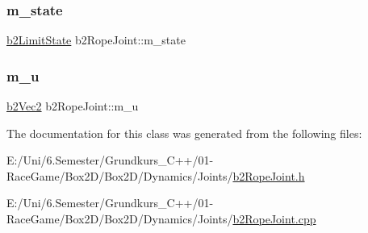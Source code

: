\mbox{\label{classb2_rope_joint_ac73c9451360c80c8a98376b922f4bed4}} 
\subsubsection{\texorpdfstring{m\_state}{m\_state}}
{\footnotesize\ttfamily \mbox{\hyperlink{b2_joint_8h_ae7784edce074221afeb010d638404443}{b2\+Limit\+State}} b2\+Rope\+Joint\+::m\+\_\+state\hspace{0.3cm}{\ttfamily [protected]}}

\mbox{\label{classb2_rope_joint_ae95185c5ad4c119a9893294491ba1609}} 
\subsubsection{\texorpdfstring{m\_u}{m\_u}}
{\footnotesize\ttfamily \mbox{\hyperlink{structb2_vec2}{b2\+Vec2}} b2\+Rope\+Joint\+::m\+\_\+u\hspace{0.3cm}{\ttfamily [protected]}}



The documentation for this class was generated from the following files\+:\begin{DoxyCompactItemize}
\item 
E\+:/\+Uni/6.\+Semester/\+Grundkurs\+\_\+\+C++/01-\/\+Race\+Game/\+Box2\+D/\+Box2\+D/\+Dynamics/\+Joints/\mbox{\hyperlink{b2_rope_joint_8h}{b2\+Rope\+Joint.\+h}}\item 
E\+:/\+Uni/6.\+Semester/\+Grundkurs\+\_\+\+C++/01-\/\+Race\+Game/\+Box2\+D/\+Box2\+D/\+Dynamics/\+Joints/\mbox{\hyperlink{b2_rope_joint_8cpp}{b2\+Rope\+Joint.\+cpp}}\end{DoxyCompactItemize}
